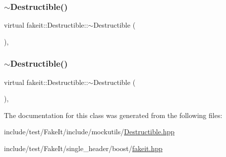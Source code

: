 \mbox{\label{classfakeit_1_1Destructible_a8b6d11459f396d2c20d536b09e5eb604}} 
\subsubsection{\texorpdfstring{$\sim$Destructible()}{~Destructible()}\hspace{0.1cm}{\footnotesize\ttfamily [8/9]}}
{\footnotesize\ttfamily virtual fakeit\+::\+Destructible\+::$\sim$\+Destructible (\begin{DoxyParamCaption}{ }\end{DoxyParamCaption})\hspace{0.3cm}{\ttfamily [inline]}, {\ttfamily [virtual]}}

\mbox{\label{classfakeit_1_1Destructible_a8b6d11459f396d2c20d536b09e5eb604}} 
\subsubsection{\texorpdfstring{$\sim$Destructible()}{~Destructible()}\hspace{0.1cm}{\footnotesize\ttfamily [9/9]}}
{\footnotesize\ttfamily virtual fakeit\+::\+Destructible\+::$\sim$\+Destructible (\begin{DoxyParamCaption}{ }\end{DoxyParamCaption})\hspace{0.3cm}{\ttfamily [inline]}, {\ttfamily [virtual]}}



The documentation for this class was generated from the following files\+:\begin{DoxyCompactItemize}
\item 
include/test/\+Fake\+It/include/mockutils/\mbox{\hyperlink{Destructible_8hpp}{Destructible.\+hpp}}\item 
include/test/\+Fake\+It/single\+\_\+header/boost/\mbox{\hyperlink{single__header_2boost_2fakeit_8hpp}{fakeit.\+hpp}}\end{DoxyCompactItemize}
